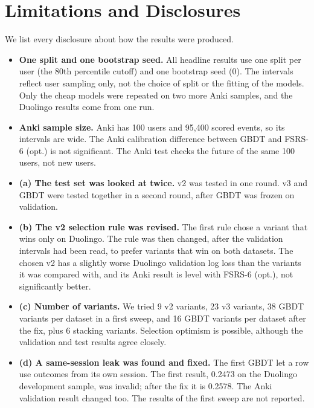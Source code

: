 \section{Limitations and Disclosures}
We list every disclosure about how the results were produced.
\begin{itemize}
\item \textbf{One split and one bootstrap seed.} All headline results use one split per user (the 80th percentile cutoff) and one bootstrap seed (0). The intervals reflect user sampling only, not the choice of split or the fitting of the models. Only the cheap models were repeated on two more Anki samples, and the Duolingo results come from one run.
\item \textbf{Anki sample size.} Anki has 100 users and 95,400 scored events, so its intervals are wide. The Anki calibration difference between GBDT and FSRS-6 (opt.) is not significant. The Anki test checks the future of the same 100 users, not new users.
\item \textbf{(a) The test set was looked at twice.} v2 was tested in one round. v3 and GBDT were tested together in a second round, after GBDT was frozen on validation.
\item \textbf{(b) The v2 selection rule was revised.} The first rule chose a variant that wins only on Duolingo. The rule was then changed, after the validation intervals had been read, to prefer variants that win on both datasets. The chosen v2 has a slightly worse Duolingo validation log loss than the variants it was compared with, and its Anki result is level with FSRS-6 (opt.), not significantly better.
\item \textbf{(c) Number of variants.} We tried 9 v2 variants, 23 v3 variants, 38 GBDT variants per dataset in a first sweep, and 16 GBDT variants per dataset after the fix, plus 6 stacking variants. Selection optimism is possible, although the validation and test results agree closely.
\item \textbf{(d) A same-session leak was found and fixed.} The first GBDT let a row use outcomes from its own session. The first result, 0.2473 on the Duolingo development sample, was invalid; after the fix it is 0.2578. The Anki validation result changed too. The results of the first sweep are not reported.

\end{itemize}

